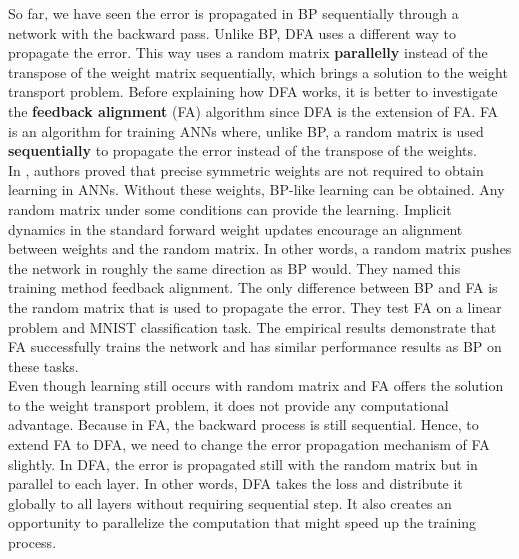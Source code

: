 \documentclass[a4paper, nobind]{templates/ociamthesis}
\begin{document}
So far, we have seen the error is propagated in BP sequentially through a network with the backward pass. Unlike BP, DFA uses a different way to propagate the error. This way uses a random matrix \textbf{parallelly} instead of the transpose of the weight matrix sequentially, which brings a solution to the weight transport problem. Before explaining how DFA works, it is better to investigate the \textbf{feedback alignment} (FA) algorithm since DFA is the extension of FA. FA is an algorithm for training ANNs where, unlike BP, a random matrix is used \textbf{sequentially} to propagate the error instead of the transpose of the weights.\\
In \cite{lillicrap2014random}, authors proved that precise symmetric weights are not required to obtain learning in ANNs. Without these weights, BP-like learning can be obtained. Any random matrix under some conditions can provide the learning. Implicit dynamics in the standard forward weight updates encourage an alignment between weights and the random matrix. In other words, a random matrix pushes the network in roughly the same direction as BP would. They named this training method feedback alignment. The only difference between BP and FA is the random matrix that is used to propagate the error. They test FA on a linear problem and MNIST classification task. The empirical results demonstrate that FA successfully trains the network and has similar performance results as BP on these tasks.\\
Even though learning still occurs with random matrix and FA offers the solution to the weight transport problem, it does not provide any computational advantage. Because in FA, the backward process is still sequential. Hence, to extend FA to DFA, we need to change the error propagation mechanism of FA slightly. In DFA, the error is propagated still with the random matrix but in parallel to each layer. In other words, DFA takes the loss and distribute it globally to all layers without requiring sequential step. It also creates an opportunity to parallelize the computation that might speed up the training process.
\end{document}
